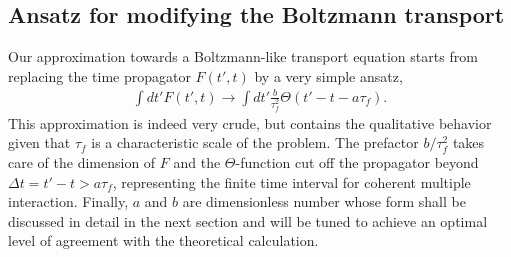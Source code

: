 \documentclass[aps, prc, reprint, amsmath, groupedaddress, nofootinbib]{revtex4-1}
\begin{document}
\subsection{Ansatz for modifying the Boltzmann transport}
Our approximation towards a Boltzmann-like transport equation starts from replacing the time propagator $F(t',t)$ by a very simple ansatz,
\begin{eqnarray}
\int dt' F(t', t) \rightarrow \int dt' \frac{b}{\tau_f^2}\Theta(t'-t-a\tau_f).
\end{eqnarray}
This approximation is indeed very crude, but contains the qualitative behavior given that $\tau_f$ is a characteristic scale of the problem.
The prefactor $b/\tau_f^2$ takes care of the dimension of $F$ and the $\Theta$-function cut off the propagator beyond $\Delta t = t'-t > a\tau_f$, representing the finite time interval for coherent multiple interaction. 
Finally, $a$ and $b$ are dimensionless number whose form shall be discussed in detail in the next section and will be tuned to achieve an optimal level of agreement with the theoretical calculation.
\end{document}
